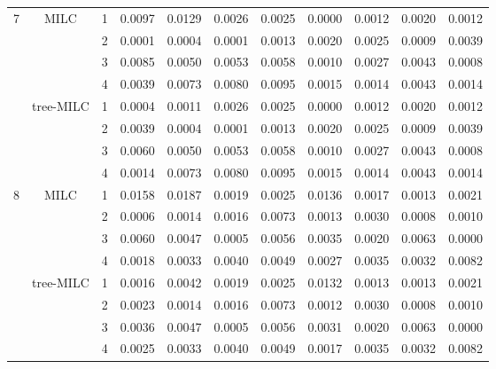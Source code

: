 \documentclass[a4paper, 11pt]{article} %
\begin{document}
\begin{table}[ht]
\begin{tabular}{cc r llll  rrrr }
 \hline
    \hline
  \multirow{8}{*}{7}
     & \multirow{4}{*}{MILC}
&  1 
& 0.0097 & 0.0129 & 0.0026 & 0.0025
& 0.0000 & 0.0012 & 0.0020 & 0.0012 \\
 && 2 
 & 0.0001 & 0.0004 & 0.0001 & 0.0013
 & 0.0020 & 0.0025 & 0.0009 & 0.0039 \\  
  &&3
 & 0.0085 & 0.0050 & 0.0053 & 0.0058
  & 0.0010 & 0.0027 & 0.0043 & 0.0008 \\    &&4
  & 0.0039 & 0.0073 & 0.0080 & 0.0095  
& 0.0015 & 0.0014 & 0.0043 & 0.0014  \\
  \cline{2-11}
   & \multirow{4}{*}{tree-MILC}
   &1
& 0.0004 & 0.0011 & 0.0026 & 0.0025
& 0.0000 & 0.0012 & 0.0020 & 0.0012 \\ 
  &&2
   & 0.0039 & 0.0004 & 0.0001 & 0.0013
& 0.0020 & 0.0025 & 0.0009 & 0.0039 \\ 
  &&3 
  & 0.0060 & 0.0050 & 0.0053 & 0.0058 
 & 0.0010 & 0.0027 & 0.0043 & 0.0008 \\ 
  &&4 
 & 0.0014 & 0.0073 & 0.0080 & 0.0095
 & 0.0015 & 0.0014 & 0.0043 & 0.0014  \\ 
    \hline
    \hline
    \multirow{8}{*}{8}
   & \multirow{4}{*}{MILC}
&  1
& 0.0158 & 0.0187 & 0.0019 & 0.0025
& 0.0136 & 0.0017 & 0.0013 & 0.0021 \\ 
 && 2 
  & 0.0006 & 0.0014 & 0.0016 & 0.0073 
& 0.0013 & 0.0030 & 0.0008 & 0.0010 \\
&&3
   & 0.0060 & 0.0047 & 0.0005 & 0.0056
 & 0.0035 & 0.0020 & 0.0063 & 0.0000  \\ 
  &&4
 & 0.0018 & 0.0033 & 0.0040 & 0.0049 
 & 0.0027 & 0.0035 & 0.0032 & 0.0082  \\
  \cline{2-11}
   & \multirow{4}{*}{tree-MILC}
   &1
 & 0.0016 & 0.0042 & 0.0019 & 0.0025 
& 0.0132 & 0.0013 & 0.0013 & 0.0021  \\ 
  &&2
& 0.0023 & 0.0014 & 0.0016 & 0.0073
 & 0.0012 & 0.0030 & 0.0008 & 0.0010 \\ 
  &&3 
& 0.0036 & 0.0047 & 0.0005 & 0.0056
 & 0.0031 & 0.0020 & 0.0063 & 0.0000 \\ 
  &&4 
&  0.0025 & 0.0033 & 0.0040 & 0.0049 
 & 0.0017 & 0.0035 & 0.0032 & 0.0082 \\  
  \hline
  \end{tabular}
\end{table}
\end{document}
